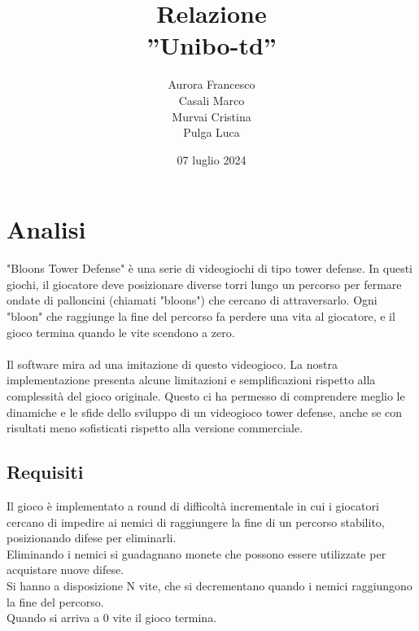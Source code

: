 \documentclass[a4paper,12pt]{report}
\title{Relazione\\''Unibo-td''}
\author{Aurora Francesco \\ 
Casali Marco \\
Murvai Cristina \\
Pulga Luca}
\date{07 luglio 2024}
\begin{document}
\maketitle

\tableofcontents

\chapter{Analisi}
"Bloons Tower Defense" è una serie di videogiochi di tipo tower defense. In questi giochi, il giocatore deve posizionare diverse torri lungo un percorso per fermare ondate di palloncini (chiamati "bloons") che cercano di attraversarlo. Ogni "bloon" che raggiunge la fine del percorso fa perdere una vita al giocatore, e il gioco termina quando le vite scendono a zero.
\\
\\
Il software mira ad una imitazione di questo videogioco. La nostra implementazione presenta alcune limitazioni e semplificazioni rispetto alla complessità del gioco originale. Questo ci ha permesso di comprendere meglio le dinamiche e le sfide dello sviluppo di un videogioco tower defense, anche se con risultati meno sofisticati rispetto alla versione commerciale.

\section{Requisiti}

Il gioco è implementato a round di difficoltà incrementale in cui i giocatori cercano di impedire ai nemici di raggiungere la fine di un percorso stabilito, posizionando difese per eliminarli. \\
Eliminando i nemici si guadagnano monete che possono essere utilizzate per acquistare nuove difese.\\
Si hanno a disposizione N vite, che si decrementano quando i nemici raggiungono la fine del percorso.\\
Quando si arriva a 0 vite il gioco termina.
\end{document}
